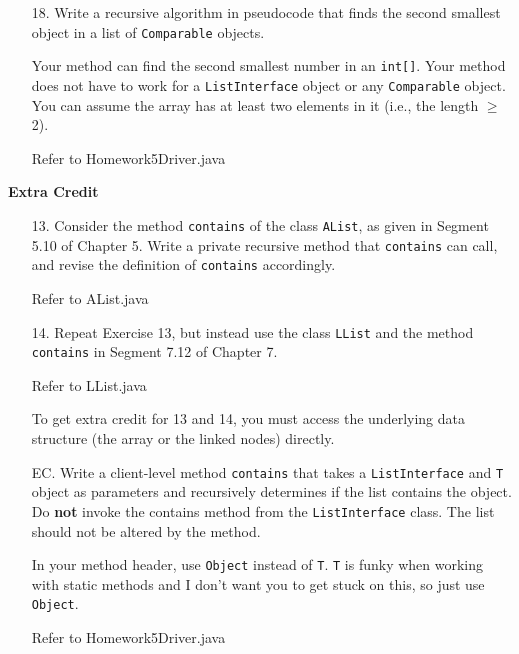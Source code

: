 \documentclass[10pt]{article}
\begin{document}
\begin{enumerate}
			
		
		\item[18.] Write a recursive algorithm in pseudocode that finds the second smallest object in a list of \texttt{Comparable} objects.
			
			Your method can find the second smallest number in an \texttt{int[]}. Your method does not have to work for a \texttt{ListInterface} object or any \texttt{Comparable} object. You can assume the array has at least two elements in it (i.e., the length $\geq$ 2).
			
			\vspace{0.5cm}
			Refer to Homework5Driver.java
			\vspace{0.5cm}
	\end{enumerate}
	
	\begin{center}
		\textbf{\large{Extra Credit}}
	\end{center}
	
	\begin{enumerate}
		\item[13.] Consider the method \texttt{contains} of the class \texttt{AList}, as given in Segment 5.10 of Chapter 5. Write a private recursive method that \texttt{contains} can call, and revise the definition of \texttt{contains} accordingly.
			
			\vspace{0.5cm}
			Refer to AList.java
			\vspace{0.5cm}
		
		\item[14.] Repeat Exercise 13, but instead use the class \texttt{LList} and the method \texttt{contains} in Segment 7.12 of Chapter 7.
			
			\vspace{0.5cm}
			Refer to LList.java
			\vspace{0.5cm}
		
		To get extra credit for 13 and 14, you must access the underlying data structure (the array or the linked nodes) directly.
		
		\item[EC.] Write a client-level method \texttt{contains} that takes a \texttt{ListInterface} and \texttt{T} object as parameters and recursively determines if the list contains the object. Do \textbf{not} invoke the contains method from the \texttt{ListInterface} class. The list should not be altered by the method.
			
			In your method header, use \texttt{Object} instead of \texttt{T}. \texttt{T} is funky when working with static methods and I don't want you to get stuck on this, so just use \texttt{Object}.
			
			\vspace{0.5cm}
			Refer to Homework5Driver.java
	\end{enumerate}
\end{document}
